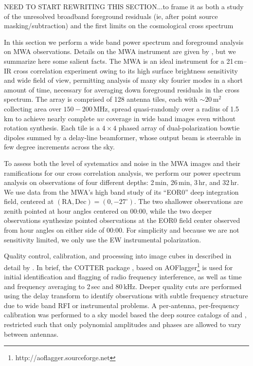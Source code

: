 \documentclass[preprint]{aastex}
\begin{document}
NEED TO START REWRITING THIS SECTION...to frame it as both a study of the unresolved broadband foreground residuals (ie, after point source masking/subtraction) and the first limits on the cosmological cross spectrum

In this section we perform a wide band power spectrum and foreground analysis on MWA observations. Details on the MWA instrument are given by \citet{tingay13}, but we summarize here some salient facts. The MWA is an ideal instrument for a 21\,cm--IR cross correlation experiment owing to its high surface brightness sensitivity and wide field of view, permitting analysis of many sky fourier modes in a short amount of time, necessary for averaging down foreground residuals in the cross spectrum. The array is comprised of 128 antenna tiles, each with $\sim20\,\text{m}^2$ collecting area over $150-200\,$MHz, spread quasi-randomly over a radius of 1.5\,km to achieve nearly complete $uv$ coverage in wide band images even without rotation synthesis. Each tile is a $4\times4$ phased array of dual-polarization bowtie dipoles summed by a delay-line beamformer, whose output beam is steerable in few degree increments across the sky. 

To assess both the level of systematics and noise in the MWA images and their ramifications for our cross correlation analysis, we perform our power spectrum analysis on observations of four different depths: 2\,min, 26\,min, 3\,hr, and 32\,hr. We use data from the MWA's high band study of its ``EOR0'' deep integration field, centered at $(\text{RA}, \text{Dec})=(0,-27^\circ)$. The two shallower observations are zenith pointed at hour angles centered on 00:00, while the two deeper observations synthesize pointed observations at the EOR0 field center observed from hour angles on either side of 00:00. For simplicity and because we are not sensitivity limited, we only use the EW instrumental polarization.

Quality control, calibration, and processing into image cubes in described in detail by \citet{beardsley16}. In brief, the COTTER package \citep{AndreMWARFI}, based on AOFlagger\footnote{http://aoflagger.sourceforge.net} \citep{aoflagger} is used for initial identification and flagging of radio frequency interference, as well as time and frequency averaging to 2\,sec and 80\,kHz. Deeper quality cuts are performed using the delay transform \citep{parsons12b} to identify observations with subtle frequency structure due to wide band RFI or instrumental problems. A per-antenna, per-frequency calibration was performed to a sky model based the deep source catalogs of \citet{PattiCatalog1} and \citet{mwacs}, restricted such that only polynomial amplitudes and phases are allowed to vary between antennas. 
\end{document}
